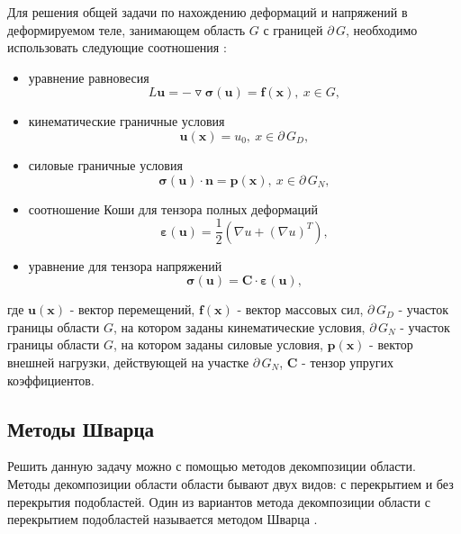 \documentclass[a4paper, 14pt]{extarticle}
\begin{document}
Для решения общей задачи по нахождению деформаций и напряжений в деформируемом теле, занимающем область $G$ с границей $\partial \, G$, необходимо использовать следующие соотношения \cite{4}:

\begin{itemize}

\item уравнение равновесия
\begin{equation}
L \mathbf{u} = - \triangledown \bm{\sigma(u)} = \mathbf{f(x)}, \ x \in G,
\end{equation}

\item кинематические граничные условия
\begin{equation}
\bm{u(x)} = u_0, \ x \in \partial \, G_D,
\end{equation}

\item силовые граничные условия
\begin{equation}
\bm{\sigma}\mathbf{(u) \cdot n} = \mathbf{p(x)}, \ x \in \partial \, G_N,
\end{equation}

\item соотношение Коши для тензора полных деформаций
\begin{equation}
\bm{\varepsilon(u)}=\dfrac{1}{2}(\nabla u + (\nabla u)^T),
\end{equation}

\item уравнение для тензора напряжений
\begin{equation}
\bm{\sigma(u)} = \mathbf{C \cdot} \bm{\varepsilon}\mathbf{(u)},
\end{equation}
\end{itemize}

где $\mathbf{u(x)}$ - вектор перемещений, $\mathbf{f(x)}$ - вектор массовых сил, $\partial \, G_D$ - участок границы области $G$, на котором заданы кинематические условия, $\partial \, G_N$ - участок границы области $G$, на котором заданы силовые условия, $\mathbf{p(x)}$ - вектор внешней нагрузки, действующей на участке $\partial \, G_N$, $\mathbf{C}$ - тензор упругих коэффициентов. 

\newpage

\subsection{Методы Шварца}

Решить данную задачу можно с помощью методов декомпозиции области. Методы декомпозиции области области бывают двух видов: с перекрытием и без перекрытия подобластей. Один из вариантов метода декомпозиции области с перекрытием подобластей называется методом Шварца \cite{1}.
\end{document}
